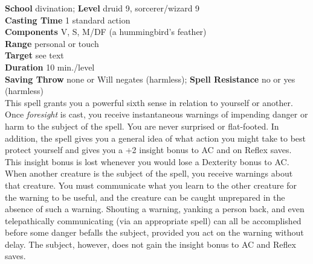 \textbf{School} divination; \textbf{Level} druid 9, sorcerer/wizard 9\\
\textbf{Casting Time} 1 standard action\\
\textbf{Components} V, S, M/DF (a hummingbird's feather)\\
\textbf{Range} personal or touch\\
\textbf{Target} see text\\
\textbf{Duration} 10 min./level\\
\textbf{Saving Throw} none or Will negates (harmless); \textbf{Spell Resistance} no or yes (harmless)\\
This spell grants you a powerful sixth sense in relation to yourself or another. Once \textit{foresight }is cast, you receive instantaneous warnings of impending danger or harm to the subject of the spell. You are never surprised or flat-footed. In addition, the spell gives you a general idea of what action you might take to best protect yourself and gives you a +2 insight bonus to AC and on Reflex saves. This insight bonus is lost whenever you would lose a Dexterity bonus to AC.\\
When another creature is the subject of the spell, you receive warnings about that creature. You must communicate what you learn to the other creature for the warning to be useful, and the creature can be caught unprepared in the absence of such a warning. Shouting a warning, yanking a person back, and even telepathically communicating (via an appropriate spell) can all be accomplished before some danger befalls the subject, provided you act on the warning without delay. The subject, however, does not gain the insight bonus to AC and Reflex saves.\\

